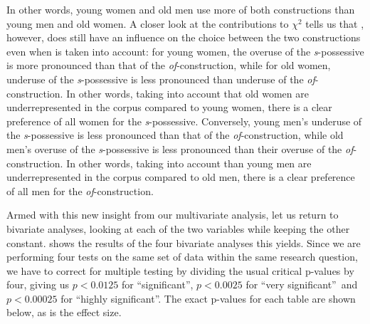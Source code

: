 In other words, young women and old men use more of both constructions than young men and old women. A closer look at the contributions to $\chi^2$  tells us that , however, does still have an influence on the choice between the two constructions even when  is taken into account: for young women, the overuse of the \textit{s}-possessive  is more pronounced than that of the \textit{of}-construction, while for old women, underuse of the \textit{s}-possessive is less pronounced than underuse of the \textit{of}-construction. In other words, taking into account that old women are underrepresented  in the corpus compared to young women, there is a clear preference of all women for the \textit{s}-possessive. Conversely, young men's underuse of the \textit{s}-possessive is less pronounced than that of the \textit{of}-construction, while old men's overuse of the \textit{s}-possessive  is less pronounced than their overuse of the \textit{of}-construction. In other words, taking into account than young men are underrepresented in the corpus compared to old men, there is a clear preference of all men for the \textit{of}-construction.

Armed with this new insight from our multivariate  analysis, let us return to bivariate  analyses, looking at each of the two variables while keeping the other constant.  shows the results of the four bivariate analyses this yields. Since we are performing four tests on the same set of data within the same research question, we have to correct for multiple testing by dividing the usual critical p\hyp{}values  by four, giving us $p < 0.0125$ for ``significant'', $p < 0.0025$ for ``very significant'' and $p < 0.00025$ for ``highly significant''. The exact p\hyp{}values for each table are shown below, as is the effect  size.

